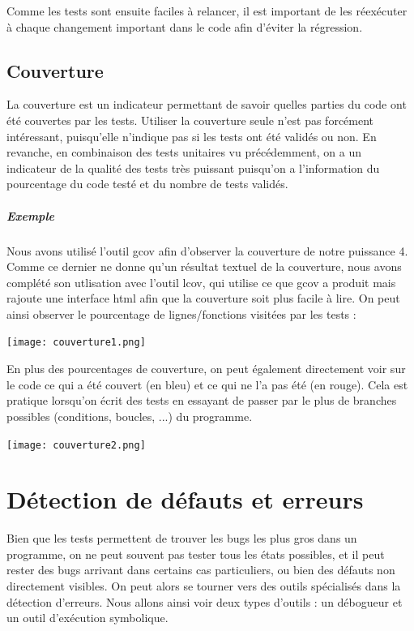 \documentclass{report}
\begin{document}
Comme les tests sont ensuite faciles à relancer, il est important de les réexécuter à chaque changement important dans le code afin d'éviter la régression.

\section{Couverture}
La couverture est un indicateur permettant de savoir quelles parties du code ont été couvertes par les tests. Utiliser la couverture seule n'est pas forcément intéressant, puisqu'elle n'indique pas si les tests ont été validés ou non. En revanche, en combinaison des tests unitaires vu précédemment, on a un indicateur de la qualité des tests très puissant puisqu'on a l'information du pourcentage du code testé et du nombre de tests validés.
\paragraph{Exemple}
Nous avons utilisé l'outil gcov afin d'observer la couverture de notre puissance 4. Comme ce dernier ne donne qu'un résultat textuel de la couverture, nous avons complété son utlisation avec l'outil lcov, qui utilise ce que gcov a produit mais rajoute une interface html afin que la couverture soit plus facile à lire. On peut ainsi observer le pourcentage de lignes/fonctions visitées par les tests :

\begin{center}
  \texttt{[image: couverture1.png]}
\end{center}

En plus des pourcentages de couverture, on peut également directement voir sur le code ce qui a été couvert (en bleu) et ce qui ne l'a pas été (en rouge). Cela est pratique lorsqu'on écrit des tests en essayant de passer par le plus de branches possibles (conditions, boucles, ...) du programme.

\begin{center}
  \texttt{[image: couverture2.png]}
\end{center}

\chapter{Détection de défauts et erreurs}
Bien que les tests permettent de trouver les bugs les plus gros dans un programme, on ne peut souvent pas tester tous les états possibles, et il peut rester des bugs arrivant dans certains cas particuliers, ou bien des défauts non directement visibles. On peut alors se tourner vers des outils spécialisés dans la détection d'erreurs. Nous allons ainsi voir deux types d'outils : un débogueur et un outil d'exécution symbolique.
\end{document}
